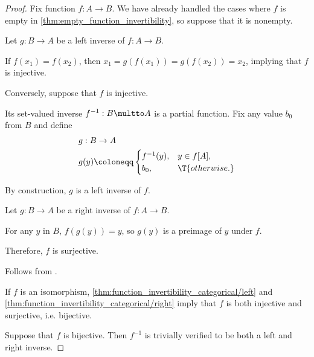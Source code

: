 \begin{proof}
  Fix function \( f: A \to B \). We have already handled the cases where \( f \) is empty in \cref{thm:empty_function_invertibility}, so suppose that it is nonempty.


  \SufficiencySubProof* Let \( g: B \to A \) be a left inverse of \( f: A \to B \).

  If \( f(x_1) = f(x_2) \), then \( x_1 = g(f(x_1)) = g(f(x_2)) = x_2 \), implying that \( f \) is injective.

  \NecessitySubProof* Conversely, suppose that \( f \) is injective.

  Its set-valued inverse \( f^{-1}: B \multto A \) is a partial function. Fix any value \( b_0 \) from \( B \) and define
  \begin{equation*}
    \begin{aligned}
      &g: B \to A \\
      &g(y) \coloneqq \begin{cases}
        f^{-1}(y), &y \in f[A], \\
        b_0,       &\T{otherwise.}
      \end{cases}
    \end{aligned}
  \end{equation*}

  By construction, \( g \) is a left inverse of \( f \).


  \SufficiencySubProof* Let \( g: B \to A \) be a right inverse of \( f: A \to B \).

  For any \( y \) in \( B \), \( f(g(y)) = y \), so \( g(y) \) is a preimage of \( y \) under \( f \).

  Therefore, \( f \) is surjective.

  \NecessitySubProof* Follows from .


  \SufficiencySubProof* If \( f \) is an isomorphism, \cref{thm:function_invertibility_categorical/left} and \cref{thm:function_invertibility_categorical/right} imply that \( f \) is both injective and surjective, i.e. bijective.

  \NecessitySubProof* Suppose that \( f \) is bijective. Then \( f^{-1} \) is trivially verified to be both a left and right inverse.
\end{proof}

